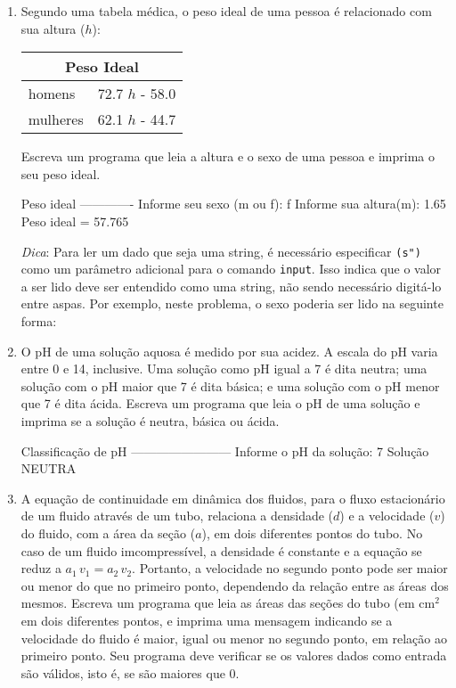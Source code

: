 \documentclass[11pt,fleqn]{practice}
\begin{document}
\begin{enumerate}

\item Segundo uma tabela médica, o peso ideal de uma pessoa é relacionado com sua altura ($h$):
\begin{center}
\begin{tabular}{ll} 
\multicolumn{2}{c}{Peso Ideal} \\\hline
homens     & 72.7 $h$ - 58.0 \\
mulheres   & 62.1 $h$ - 44.7 \\\hline
\end{tabular}
\end{center}
Escreva um programa que leia a altura e o sexo de uma pessoa e imprima o seu peso ideal. 

  \begin{runexample}
Peso ideal
-------------
Informe seu sexo (m ou f): f
Informe sua altura(m):  1.65
Peso ideal = 57.765
\end{runexample}

\emph{Dica\/}: Para ler um dado que seja uma string, é necessário especificar \texttt{(s")} como um parâmetro adicional  para o comando \texttt{input}. Isso indica que o valor a ser lido deve ser entendido como uma string, não sendo necessário digitá-lo entre aspas. Por exemplo, neste problema, o sexo poderia ser lido  na seguinte forma:
\begin{lst}{text} sexo = input("Informe o sexo: ","s")} \end{lst}

\item O pH de uma solução aquosa é medido por sua acidez. A escala do pH varia entre 0 e 14, inclusive. Uma solução como pH igual a 7 é dita neutra; uma solução com o pH maior que 7 é dita básica; e uma solução com o pH menor que 7 é dita ácida. Escreva um programa que leia o pH de uma solução e imprima se a solução é neutra, básica ou ácida.

  \begin{runexample}
Classificação de pH
------------------------
Informe o pH da solução: 7
Solução NEUTRA 
\end{runexample}


\item A equação de continuidade em dinâmica dos fluidos, para o fluxo estacionário de um fluido através de um tubo, relaciona a densidade ($d$) e a velocidade ($v$) do fluido, com a área da seção ($a$), em dois diferentes pontos do tubo. No caso de um fluido imcompressível, a densidade é constante e a equação se reduz a $a_1\, v_1 = a_2\, v_2$. Portanto, a velocidade no segundo ponto pode ser maior ou menor do que no primeiro ponto, dependendo da relação entre as áreas dos mesmos. Escreva um programa que leia as áreas das seções do tubo (em $\text{cm}^2$ em dois diferentes pontos, e imprima uma mensagem indicando se a velocidade do fluido é maior, igual ou menor no segundo ponto, em relação ao primeiro ponto. Seu programa deve verificar se os valores dados como entrada são válidos, isto é, se são maiores que 0. 


\end{enumerate}
\end{document}
